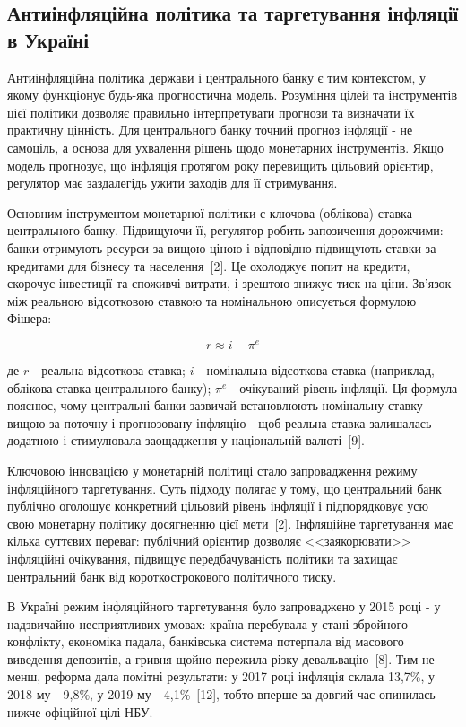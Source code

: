 \documentclass[a4paper,ukrainian,oneside]{extreport}
\begin{document}
\subsection{Антиінфляційна політика та таргетування інфляції в Україні}

Антиінфляційна політика держави і центрального банку є тим контекстом, у якому функціонує будь-яка прогностична модель. Розуміння цілей та інструментів цієї політики дозволяє правильно інтерпретувати прогнози та визначати їх практичну цінність. Для центрального банку точний прогноз інфляції - не самоціль, а основа для ухвалення рішень щодо монетарних інструментів. Якщо модель прогнозує, що інфляція протягом року перевищить цільовий орієнтир, регулятор має заздалегідь ужити заходів для її стримування.

Основним інструментом монетарної політики є ключова (облікова) ставка центрального банку. Підвищуючи її, регулятор робить запозичення дорожчими: банки отримують ресурси за вищою ціною і відповідно підвищують ставки за кредитами для бізнесу та населення~[2]. Це охолоджує попит на кредити, скорочує інвестиції та споживчі витрати, і зрештою знижує тиск на ціни. Зв'язок між реальною відсотковою ставкою та номінальною описується формулою Фішера:

\begin{equation}
r \approx i - \pi^e
\end{equation}

де $r$ - реальна відсоткова ставка; $i$ - номінальна відсоткова ставка (наприклад, облікова ставка центрального банку); $\pi^e$ - очікуваний рівень інфляції. Ця формула пояснює, чому центральні банки зазвичай встановлюють номінальну ставку вищою за поточну і прогнозовану інфляцію - щоб реальна ставка залишалась додатною і стимулювала заощадження у національній валюті~[9].

Ключовою інновацією у монетарній політиці стало запровадження режиму інфляційного таргетування. Суть підходу полягає у тому, що центральний банк публічно оголошує конкретний цільовий рівень інфляції і підпорядковує усю свою монетарну політику досягненню цієї мети~[2]. Інфляційне таргетування має кілька суттєвих переваг: публічний орієнтир дозволяє <<заякорювати>> інфляційні очікування, підвищує передбачуваність політики та захищає центральний банк від короткострокового політичного тиску.

В Україні режим інфляційного таргетування було запроваджено у 2015 році - у надзвичайно несприятливих умовах: країна перебувала у стані збройного конфлікту, економіка падала, банківська система потерпала від масового виведення депозитів, а гривня щойно пережила різку девальвацію~[8]. Тим не менш, реформа дала помітні результати: у 2017 році інфляція склала 13,7\%, у 2018-му - 9,8\%, у 2019-му - 4,1\%~[12], тобто вперше за довгий час опинилась нижче офіційної цілі НБУ.
\end{document}
